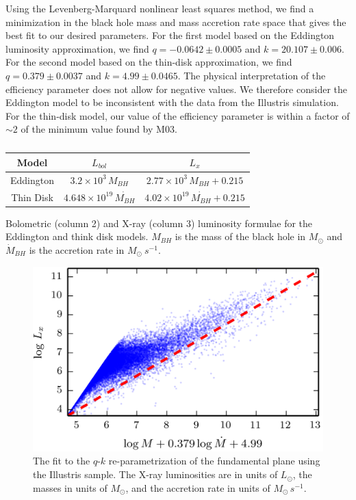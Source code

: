 Using the Levenberg-Marquard nonlinear least squares method, we find
a minimization in the black hole mass and mass accretion rate space
that gives the best fit to our desired parameters. For the first model
based on the Eddington luminosity approximation, we find $q=-0.0642\pm0.0005$
and $k=20.107\pm0.006$. For the second model based on the thin-disk
approximation, we find $q=0.379\pm0.0037$ and $k=4.99\pm0.0465$.
The physical interpretation of the efficiency parameter does not allow
for negative values. We therefore consider the Eddington model to
be inconsistent with the data from the Illustris simulation. For the
thin-disk model, our value of the efficiency parameter is within a
factor of $\sim2$ of the minimum value found by M03.
\begin{table}
\centering{}\protect\caption{\label{tab:luminosityConversions}}
\begin{tabular}{ccc}
\toprule 
Model & $L_{bol}$ & $L_{x}$\tabularnewline
\midrule
\midrule 
Eddington & $3.2\times10^{3}\, M_{BH}$ & $2.77\times10^{3}\, M_{BH}+0.215$\tabularnewline
\midrule 
Thin Disk & $4.648\times10^{19}\,\dot{M_{BH}}$ & $4.02\times10^{19}\,\dot{M_{BH}}+0.215$\tabularnewline
\bottomrule
\end{tabular}Bolometric (column 2) and X-ray (column 3) luminosity formulae for
the Eddington and think disk models. $M_{BH}$ is the mass of the
black hole in $M_{\odot}$ and $\dot{M}_{BH}$ is the accretion rate
in $M_{\odot}\: s^{-1}$.
\end{table}
\begin{figure}
\centering{}\includegraphics{Figures/fp_fit}
\protect\caption{\label{fig:q_nr_hist}The fit to the $q$-$k$
  re-parametrization of the fundamental plane
using the Illustris sample. The X-ray luminosities are in units of $L_{\odot}$,
the masses in units of $M_{\odot}$, and the accretion rate in units
of $M_{\odot}\, s^{-1}$.}
\end{figure}
